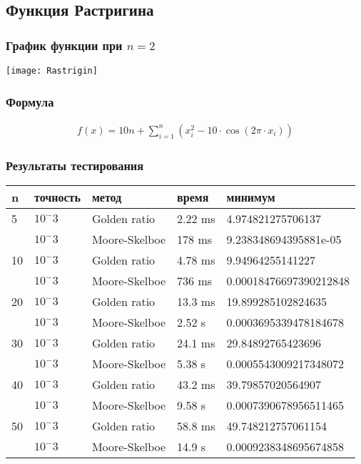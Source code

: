 \documentclass{article}
\begin{document}
    \subsection{Функция Растригина}

    \subsubsection{График функции при $n=2$}
    \texttt{[image: Rastrigin]}

    \subsubsection{Формула}
    \begin{gather*}
        f(x)=10 n+\sum_{i=1}^n\left(x_i^2-10 \cdot \cos \left(2 \pi \cdot x_i\right)\right)
    \end{gather*}

    \subsubsection{Результаты тестирования}

    \begin{tabular}{ |p{2cm}|p{2cm}|p{3cm}|p{2cm}|p{4cm}|  }
        \hline
        n  & точность & метод         & время   & минимум                \\
        \hline
        5  & $10^-3$  & Golden ratio  & 2.22 ms & 4.974821275706137      \\\cline{2-5}
        & $10^-3$  & Moore-Skelboe & 178 ms  & 9.238348694395881e-05  \\
        \hline
        10 & $10^-3$  & Golden ratio  & 4.78 ms & 9.94964255141227       \\\cline{2-5}
        & $10^-3$  & Moore-Skelboe & 736 ms  & 0.00018476697390212848 \\
        \hline
        20 & $10^-3$  & Golden ratio  & 13.3 ms & 19.899285102824635     \\\cline{2-5}
        & $10^-3$  & Moore-Skelboe & 2.52 s  & 0.0003695339478184678  \\
        \hline
        30 & $10^-3$  & Golden ratio  & 24.1 ms & 29.84892765423696      \\\cline{2-5}
        & $10^-3$  & Moore-Skelboe & 5.38 s  & 0.0005543009217348072  \\
        \hline
        40 & $10^-3$  & Golden ratio  & 43.2 ms & 39.79857020564907      \\\cline{2-5}
        & $10^-3$  & Moore-Skelboe & 9.58 s  & 0.0007390678956511465  \\
        \hline
        50 & $10^-3$  & Golden ratio  & 58.8 ms & 49.748212757061154     \\\cline{2-5}
        & $10^-3$  & Moore-Skelboe & 14.9 s  & 0.0009238348695674858  \\
        \hline

    \end{tabular}
\end{document}
